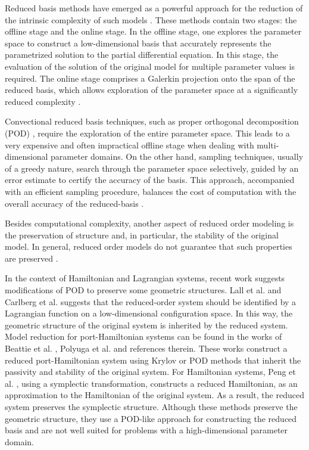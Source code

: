 \documentclass[final]{siamart}
\begin{document}
Reduced basis methods have emerged as a powerful approach for the reduction of the intrinsic complexity of such models \cite{Ito:1998up,Ito:1998ch,Ito:2001ev,Peterson:1989ki}. These methods contain two stages: {{\color{black}} the offline stage and the online stage}. In the offline stage, one explores the parameter space to construct a low-dimensional basis that accurately represents the parametrized solution to the partial differential equation. In this stage, the evaluation of the solution of the original model for multiple parameter values is required. The online stage comprises a Galerkin projection onto the span of the reduced basis, which allows exploration of the parameter space at a significantly reduced complexity \cite{Antoulas:2005:ALD:1088857,Anonymous:2016wl}.

Convectional reduced basis techniques, such as proper orthogonal decomposition (POD) \cite{Kunisch:2002er,Atwell:2001ja,Ravindran:2002hn}, require the exploration of the entire parameter space. This leads to a very expensive and often impractical offline {{\color{black}} stage} when dealing with multi-dimensional parameter domains. On the other hand, sampling techniques, usually of a greedy nature, search through the parameter space selectively, guided by an error estimate to certify the accuracy of the basis. This approach, accompanied with an efficient sampling procedure, {{\color{black}} balances the cost} of computation with the overall accuracy of the reduced-basis \cite{Cuong:2005gd,Rozza:2005ie,Anonymous:2016wl}.

{{\color{black}} Besides} computational complexity, another aspect of reduced order modeling is the preservation of structure and, in particular, {{\color{black}} the} stability of the original model. In general, reduced order models do not guarantee that such properties are preserved \cite{Anonymous:pMn0O0Q4}. 

In the context of Hamiltonian and Lagrangian systems, recent work suggests modifications of POD to preserve {{\color{black}} some} geometric structures. Lall et al. \cite{Lall:2003iy} and Carlberg et al. \cite{Carlberg:2014ky} suggests that the reduced-order system should be identified by a Lagrangian function on a low-dimensional configuration space. In this way, the geometric structure of the original system is inherited by the reduced system. {{\color{black}} Model reduction for port-Hamiltonian systems can be found in the works of Beattie et al. \cite{Chaturantabut:2016he}, Polyuga et al. \cite{Polyuga:2010gj} and references therein. These works construct a reduced port-Hamiltonian system using Krylov or POD methods that inherit the passivity and stability of the original system.} For Hamiltonian systems, Peng et al. \cite{Peng:2014di}, using a symplectic transformation, constructs a reduced Hamiltonian, as an approximation to the Hamiltonian of the original system. As a result, the reduced system preserves the symplectic structure. Although these methods preserve {{\color{black}} the} geometric structure, they use a POD-like approach for constructing the reduced basis and are not well {{\color{black}} suited} for problems with a high-dimensional parameter domain.
\end{document}
